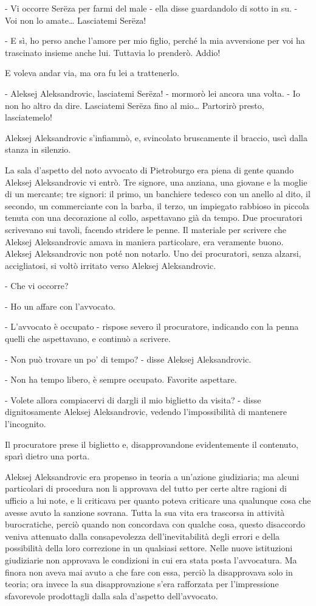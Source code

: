 - Vi occorre Serëza per farmi del male - ella disse guardandolo di sotto in su. - Voi non lo amate\ldots{} Lasciatemi Serëza! 

- E sì, ho perso anche l'amore per mio figlio, perché la mia avversione per voi ha trascinato insieme anche lui. Tuttavia lo prenderò. Addio! 

E voleva andar via, ma ora fu lei a trattenerlo. 

- Aleksej Aleksandrovic, lasciatemi Serëza! - mormorò lei ancora una volta. - Io non ho altro da dire. Lasciatemi Serëza fino al mio\ldots{} Partorirò presto, lasciatemelo! 

Aleksej Aleksandrovic s'infiammò, e, svincolato bruscamente il braccio, uscì dalla stanza in silenzio. 

La sala d'aspetto del noto avvocato di Pietroburgo era piena di gente quando Aleksej Aleksandrovic vi entrò. Tre signore, una anziana, una giovane e la moglie di un mercante; tre signori: il primo, un banchiere tedesco con un anello al dito, il secondo, un commerciante con la barba, il terzo, un impiegato rabbioso in piccola tenuta con una decorazione al collo, aspettavano già da tempo. Due procuratori scrivevano sui tavoli, facendo stridere le penne. Il materiale per scrivere che Aleksej Aleksandrovic amava in maniera particolare, era veramente buono. Aleksej Aleksandrovic non poté non notarlo. Uno dei procuratori, senza alzarsi, accigliatosi, si voltò irritato verso Aleksej Aleksandrovic. 

- Che vi occorre? 

- Ho un affare con l'avvocato. 

- L'avvocato è occupato - rispose severo il procuratore, indicando con la penna quelli che aspettavano, e continuò a scrivere. 

- Non può trovare un po' di tempo? - disse Aleksej Aleksandrovic. 

- Non ha tempo libero, è sempre occupato. Favorite aspettare. 

- Volete allora compiacervi di dargli il mio biglietto da visita? - disse dignitosamente Aleksej Aleksandrovic, vedendo l'impossibilità di mantenere l'incognito. 

Il procuratore prese il biglietto e, disapprovandone evidentemente il contenuto, sparì dietro una porta. 

Aleksej Aleksandrovic era propenso in teoria a un'azione giudiziaria; ma alcuni particolari di procedura non li approvava del tutto per certe altre ragioni di ufficio a lui note, e li criticava per quanto poteva criticare una qualunque cosa che avesse avuto la sanzione sovrana. Tutta la sua vita era trascorsa in attività burocratiche, perciò quando non concordava con qualche cosa, questo disaccordo veniva attenuato dalla consapevolezza dell'inevitabilità degli errori e della possibilità della loro correzione in un qualsiasi settore. Nelle nuove istituzioni giudiziarie non approvava le condizioni in cui era stata posta l'avvocatura. Ma finora non aveva mai avuto a che fare con essa, perciò la disapprovava solo in teoria; ora invece la sua disapprovazione s'era rafforzata per l'impressione sfavorevole prodottagli dalla sala d'aspetto dell'avvocato. 

